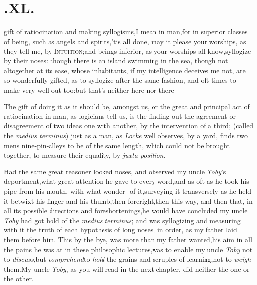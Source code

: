 \documentclass{article}
\begin{document}
\bigskip


\newpage
\null
\section{.\quad  XL.}

 gift of ratiocination and making
syllogisms,\tsh I mean in man,\tsk for in superior classes
of being, such as angels and spirits,\tsh ’tis all
done, may it please your worships, as they tell me, by
\textsc{Intuition};\tsk and beings inferior, as your
worships all know,\tsh syllogize by their noses: though
there is an island swimming in the sea, though not altogether at
its ease, whose inhabitants, if my intelligence deceives me not,
are so wonderfully gifted, as to syllogize after the same fashion,
and oft-times to make very well out too:\tsh but
that’s neither here nor there\tsh

The gift of doing it as it should be, amongst us, \tsk or the
great and principal act of ratiocination in man, as logicians tell
us, is the finding out the agreement or disagreement of two ideas
one with another, by the intervention of a third; (called the
\textit{medius terminus}) just as a man, as \textit{Locke} well
observes, by a yard, finds two mens nine-pin-alleys to be of the same
length, which could not be brought together, to measure their
equality, by \textit{juxta-position.}

Had the same great reasoner looked  noses, and observed my uncle \textit{Toby}’s
deportment,\tsk what great attention he gave to every
word,\tsk and as oft as he took his pipe from his mouth, with what
wonder-\break {} of
it,\tsk surveying it transversely as he held it betwixt his
finger and his thumb,\break\tsk then foreright,\tsk then
this way, and then that, in all its possible directions and
foreshortenings,\tsh he would have concluded my uncle
\textit{Toby} had got hold of the \textit{medius terminus}; and was
syllogizing and measuring with it the truth of each hypothesis of
long noses, in order, as my father laid them before him. This
by the bye, was more than my father wanted,\tsh his aim in
all the pains he was at in these philosophic lectures,\tsk was to
enable my uncle \textit{Toby} not to
\textit{discuss},\tsk but \textit{comprehend}\tsk to \textit{hold} the grains
and scruples of learning,\tsk not to \textit{weigh}
them.\tsk\break My uncle \textit{Toby}, as you will read in the
next chapter, did neither the one or the other.
\end{document}
